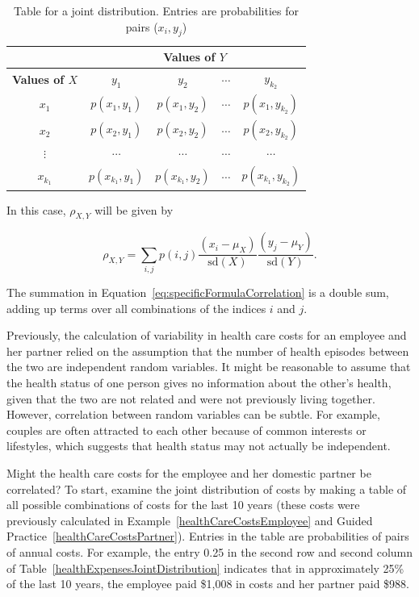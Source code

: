 \begin{table}[h]
	\caption{Table for a joint distribution. Entries are probabilities for pairs ($x_i, y_j$)}
	\label{table:generalJointDistribution}
	\centering
	\begin{tabular}{ccccc}
		\hline
		& \multicolumn{4}{c}{\textbf{Values of $Y$}} \\
		\hline
		\textbf{Values of $X$} & $y_1$ & $y_2$ & $\cdots$ & $y_{k_2}$ \\
		             $x_1$ &   $p(x_1, y_1)$ &   $p(x_1, y_2)$  & $\cdots$  & $p(x_1, y_{k_2})$  \\
		              $x_2$ &  $p(x_2, y_1)$   &  $p(x_2, y_2)$  & $\cdots$ &   $p(x_2, y_{k_2})$ \\
		             $\vdots$ &   $\cdots$  &  $\cdots$  &  $\cdots$ &   $\cdots$ \\
		              $x_{k_1}$ & $p(x_{k_1}, y_1)$ &  $p(x_{k_1}, y_2)$  &  $\cdots$ & $p(x_{k_1}, y_{k_2})$ \\
		             
	\end{tabular}
\end{table}

In this case, $\rho_{X,Y}$ will be given by

\begin{equation*}
	\rho_{X,Y} = \sum_{i,j} p(i,j)\frac{(x_i - \mu_X)}{\textrm{sd}(X)}\frac{(y_j - \mu_Y)}{\textrm{sd}(Y)}.
	\label{eq:specificFormulaCorrelation}
\end{equation*}

The summation in Equation~\ref{eq:specificFormulaCorrelation} is a double sum, adding up terms over all combinations of the indices $i$ and $j$.

Previously, the calculation of variability in health care costs for an employee and her partner relied on the assumption that the number of health episodes between the two are independent random variables. It might be reasonable to assume that the health status of one person gives no information about the other's health, given that the two are not related and were not previously living together. However, correlation between random variables can be subtle. For example, couples are often attracted to each other because of common interests or lifestyles, which suggests that health status may not actually be independent.

Might the health care costs for the employee and her domestic partner be correlated? To start, examine the joint distribution of costs by making a table of all possible combinations of costs for the last 10 years (these costs were previously calculated in Example~\ref{healthCareCostsEmployee} and Guided Practice~\ref{healthCareCostsPartner}). Entries in the table are probabilities of pairs of annual costs. For example, the entry 0.25 in the second row and second column of Table~\ref{healthExpensesJointDistribution} indicates that in approximately 25\% of the last 10 years, the employee paid \$1,008 in costs and her partner paid \$988.

